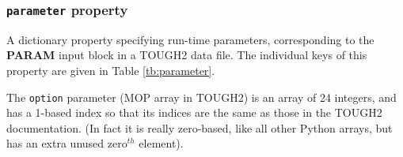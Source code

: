 \begin{snugshade}
\subsubsection{\texttt{parameter} property}
\end{snugshade}
\label{sec:t2data:parameter}

A dictionary property specifying run-time parameters, corresponding to the \textbf{PARAM} input block in a TOUGH2 data file.  The individual keys of this property are given in Table \ref{tb:parameter}.

The \texttt{option} parameter (MOP array in TOUGH2) is an array of 24 integers, and has a 1-based index so that its indices are the same as those in the TOUGH2 documentation.  (In fact it is really zero-based, like all other Python arrays, but has an extra unused zero$^{th}$ element).

